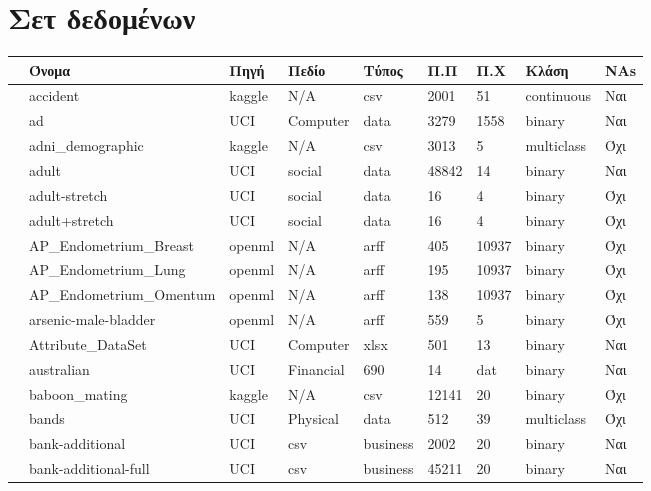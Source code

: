 
	\chapter{Σετ δεδομένων }
\label{appendix:Datasets}
{ \footnotesize
	 	\begin{longtable}{|l| l| l | l | l | l |l | l | l | } 
 			\hline
 			 & Όνομα & Πηγή & Πεδίο & Τύπος & { Π.Π} & {Π.Χ} & Κλάση & NAs \\
 			\hline
 							\rownumber  & accident \citep{accident} & kaggle & N/A  & csv & 2001  & 51 &  continuous & Ναι \\
 							\rownumber & ad \citep{ad} & UCI & Computer  & data & 3279 &  1558 & binary & Ναι\\
 							\rownumber & adni\_demographic & kaggle & N/A & csv & 3013 &5 &multiclass &Όχι\\
 							\rownumber &  adult  \citep{census}  & UCI & social & data  & 48842 & 14 & binary & Ναι\\
 							\rownumber &  adult-stretch  \citep{balloons} & UCI & social & data & 16 & 4 & binary & Όχι\\
 							\rownumber &  adult+stretch  \citep{balloons} & UCI & social & data & 16 & 4 & binary & Όχι\\
 							\rownumber &  AP\_Endometrium\_Breast \citep{breast} & openml & N/A & arff & 405 & 10937 & binary & Όχι\\
 							\rownumber & AP\_Endometrium\_Lung \citep{lung} & openml & N/A & arff  & 195 & 10937 & binary  & Όχι\\
 							\rownumber &  AP\_Endometrium\_Omentum \citep{omentum} & openml & N/A & arff & 138 & 10937 & binary & Όχι \\
 							\rownumber & arsenic-male-bladder \citep{bladder} & openml & N/A & arff & 559 & 5 & binary & Όχι\\
 							\rownumber & Attribute\_DataSet & UCI & Computer & xlsx & 501 & 13 & binary  & Ναι \\
 							\rownumber & australian \citep{australian} & UCI  & Financial & 690 & 14 &  dat & binary & Ναι \\
 							\rownumber & baboon\_mating \citep{baboon} & kaggle & N/A & csv & 12141& 20& binary & Όχι\\
 							\rownumber &  bands \citep{bands} & UCI & Physical & data & 512 & 39& multiclass & Όχι\\
 							\rownumber & bank-additional & UCI & csv & business & 2002 & 20 & binary & Ναι \\
 							\rownumber &  bank-additional-full & UCI & csv& business & 45211& 20& binary& Ναι \\

\end{longtable}}
